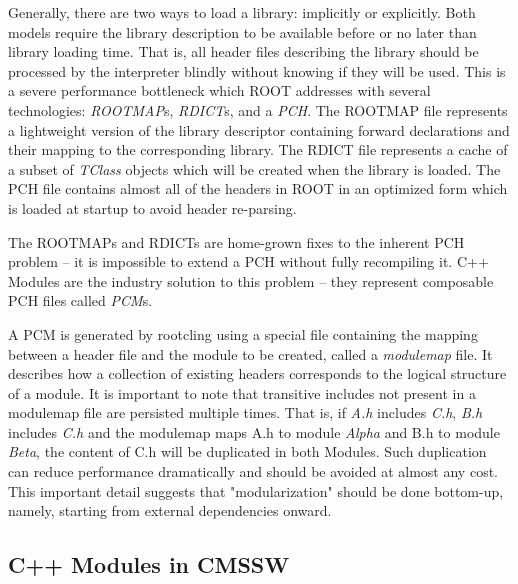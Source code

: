 \documentclass[12pt]{iopart}
\begin{document}
Generally, there are two ways to load a library: implicitly or explicitly. Both models require the library description to be available before or no later than library loading time. That is, all header files describing the library should be processed by the interpreter blindly without knowing if they will be used. This is a severe performance bottleneck which ROOT addresses with several technologies: \textit{ROOTMAP}s, \textit{RDICT}s, and a \textit{PCH}. The ROOTMAP file represents a lightweight version of the library descriptor containing forward declarations and their mapping to the corresponding library. The RDICT file represents a cache of a subset of \textit{TClass} objects which will be created when the library is loaded. The PCH file contains almost all of the headers in ROOT in an optimized form which is loaded at startup to avoid header re-parsing.

The ROOTMAPs and RDICTs are home-grown fixes to the inherent PCH problem -- it is impossible to extend a PCH without fully recompiling it. C++ Modules are the industry solution to this problem -- they represent composable PCH files called \textit{PCM}s.

A PCM is generated by rootcling using a special file containing the mapping between a header file and the module to be created, called a \textit{modulemap} file. It describes how a collection of existing headers corresponds to the logical structure of a module. It is important to note that transitive includes not present in a modulemap file are persisted multiple times. That is, if \textit{A.h} includes \textit{C.h}, \textit{B.h} includes \textit{C.h} and the modulemap maps A.h to module \textit{Alpha} and B.h to module \textit{Beta}, the content of C.h will be duplicated in both Modules. Such duplication can reduce performance dramatically and should be avoided at almost any cost. This important detail suggests that "modularization" should be done bottom-up, namely, starting from external dependencies onward.

\subsection{C++ Modules in CMSSW}
\label{cmssw}
\end{document}

